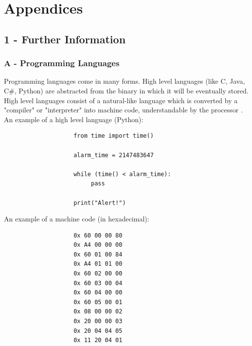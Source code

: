 \documentclass[a4]{report}
\def\achapter{preamble}  %
\begin{document}
	\newpage
	\def\achapter{Bibliography}
	
	



\appendix


\chapter*{Appendices}
\def\achapter{Appendices}
\setcounter{page}{1}
\setcounter{section}{1}
\section{1 - Further Information}
\subsection{A -  Programming Languages}
Programming languages come in many forms. High level languages (like C, Java, C\#, Python) are abstracted from the binary in which it will be eventually stored. High level languages consist of a natural-like language which is converted by a "compiler" or "interpreter" into machine code, understandable by the processor \cite{proglanghighlow}.\newline \newline  \noindent
\noindent
An example of a high level language (Python):
\begin{verbatim}
                    from time import time()

                    alarm_time = 2147483647

                    while (time() < alarm_time):
                         pass

                    print("Alert!")
\end{verbatim}
An example of a machine code (in hexadecimal)\cite{proglangmachex}:
\begin{verbatim}
                    0x 60 00 00 80
                    0x A4 00 00 00
                    0x 60 01 00 84
                    0x A4 01 01 00
                    0x 60 02 00 00
                    0x 60 03 00 04
                    0x 60 04 00 00
                    0x 60 05 00 01
                    0x 08 00 00 02
                    0x 20 00 00 03
                    0x 20 04 04 05
                    0x 11 20 04 01
\end{verbatim}
\end{document}
